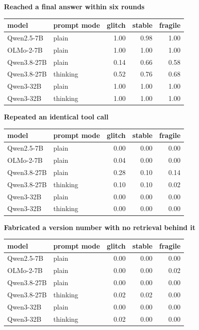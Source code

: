 \documentclass[11pt]{article}
\begin{document}
\textbf{Reached a final answer within six rounds}

\begingroup\small\setlength{\tabcolsep}{4pt}\renewcommand{\arraystretch}{1.15}

\begin{longtable}[]{@{}llrrr@{}}
\toprule\noalign{}
model & prompt mode & glitch & stable & fragile \\
\midrule\noalign{}
\endhead
\bottomrule\noalign{}
\endlastfoot
Qwen2.5-7B & plain & 1.00 & 0.98 & 1.00 \\
OLMo-2-7B & plain & 1.00 & 1.00 & 1.00 \\
Qwen3.8-27B & plain & 0.14 & 0.66 & 0.58 \\
Qwen3.8-27B & thinking & 0.52 & 0.76 & 0.68 \\
Qwen3-32B & plain & 1.00 & 1.00 & 1.00 \\
Qwen3-32B & thinking & 1.00 & 1.00 & 1.00 \\
\end{longtable}\endgroup

\textbf{Repeated an identical tool call}

\begingroup\small\setlength{\tabcolsep}{4pt}\renewcommand{\arraystretch}{1.15}

\begin{longtable}[]{@{}llrrr@{}}
\toprule\noalign{}
model & prompt mode & glitch & stable & fragile \\
\midrule\noalign{}
\endhead
\bottomrule\noalign{}
\endlastfoot
Qwen2.5-7B & plain & 0.00 & 0.00 & 0.00 \\
OLMo-2-7B & plain & 0.04 & 0.00 & 0.00 \\
Qwen3.8-27B & plain & 0.28 & 0.10 & 0.14 \\
Qwen3.8-27B & thinking & 0.10 & 0.10 & 0.02 \\
Qwen3-32B & plain & 0.00 & 0.00 & 0.00 \\
Qwen3-32B & thinking & 0.00 & 0.00 & 0.00 \\
\end{longtable}\endgroup

\textbf{Fabricated a version number with no retrieval behind it}

\begingroup\small\setlength{\tabcolsep}{4pt}\renewcommand{\arraystretch}{1.15}

\begin{longtable}[]{@{}llrrr@{}}
\toprule\noalign{}
model & prompt mode & glitch & stable & fragile \\
\midrule\noalign{}
\endhead
\bottomrule\noalign{}
\endlastfoot
Qwen2.5-7B & plain & 0.00 & 0.00 & 0.00 \\
OLMo-2-7B & plain & 0.00 & 0.00 & 0.02 \\
Qwen3.8-27B & plain & 0.00 & 0.00 & 0.00 \\
Qwen3.8-27B & thinking & 0.02 & 0.02 & 0.00 \\
Qwen3-32B & plain & 0.00 & 0.00 & 0.00 \\
Qwen3-32B & thinking & 0.02 & 0.00 & 0.00 \\
\end{longtable}\endgroup
\end{document}
